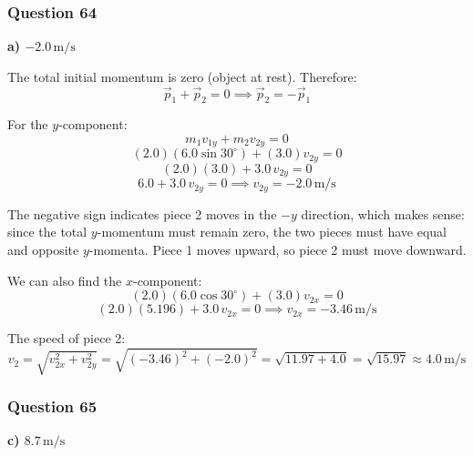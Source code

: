 \documentclass[12pt,letterpaper]{article}
\begin{document}
\subsubsection*{Question 64}

\begin{answerbox}
\textbf{a) $-2.0\,\text{m/s}$}
\end{answerbox}

\begin{explanationbox}
The total initial momentum is zero (object at rest). Therefore:
\[
\vec{p}_1 + \vec{p}_2 = 0 \implies \vec{p}_2 = -\vec{p}_1
\]

For the $y$-component:
\[
m_1 v_{1y} + m_2 v_{2y} = 0
\]
\[
(2.0)(6.0\sin 30^\circ) + (3.0)v_{2y} = 0
\]
\[
(2.0)(3.0) + 3.0\,v_{2y} = 0
\]
\[
6.0 + 3.0\,v_{2y} = 0 \implies v_{2y} = -2.0\,\text{m/s}
\]

The negative sign indicates piece 2 moves in the $-y$ direction, which makes sense:
since the total $y$-momentum must remain zero, the two pieces must have equal and opposite $y$-momenta. Piece 1 moves upward, so piece 2 must move downward.

We can also find the $x$-component:
\[
(2.0)(6.0\cos 30^\circ) + (3.0)v_{2x} = 0
\]
\[
(2.0)(5.196) + 3.0\,v_{2x} = 0 \implies v_{2x} = -3.46\,\text{m/s}
\]

The speed of piece 2:
\[
v_2 = \sqrt{v_{2x}^2 + v_{2y}^2} = \sqrt{(-3.46)^2 + (-2.0)^2} = \sqrt{11.97 + 4.0} = \sqrt{15.97} \approx 4.0\,\text{m/s}
\]
\end{explanationbox}

\subsubsection*{Question 65}

\begin{answerbox}
\textbf{c) $8.7\,\text{m/s}$}
\end{answerbox}
\end{document}
